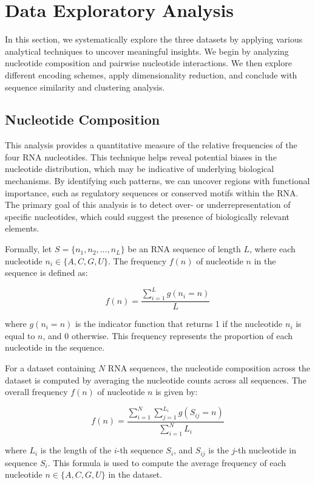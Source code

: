 \section{Data Exploratory Analysis}\label{sec:data-exploratroy-analysis}
  In this section, we systematically explore the three datasets by applying various analytical techniques to uncover meaningful insights.
  We begin by analyzing nucleotide composition and pairwise nucleotide interactions.
  We then explore different encoding schemes, apply dimensionality reduction, and conclude with sequence similarity and clustering analysis.

  \subsection{Nucleotide Composition}\label{subsec:nucleotide-composition}
    This analysis provides a quantitative measure of the relative frequencies of the four RNA nucleotides.
    This technique helps reveal potential biases in the nucleotide distribution, which may be indicative of underlying biological mechanisms.
    By identifying such patterns, we can uncover regions with functional importance, such as regulatory sequences or conserved motifs within the RNA. The primary goal of this analysis is to detect over- or underrepresentation of specific nucleotides, which could suggest the presence of biologically relevant elements.

    Formally, let \( S = \{n_1, n_2, \dots, n_L\} \) be an RNA sequence of length \( L \), where each nucleotide \( n_i \in \{A, C, G, U\} \).
    The frequency \( f(n) \) of nucleotide \( n \) in the sequence is defined as:

    \[
      f(n) = \frac{\sum_{i=1}^{L} g(n_i = n)}{L}
    \]

    where \( g(n_i = n) \) is the indicator function that returns 1 if the nucleotide \( n_i \) is equal to \( n \), and 0 otherwise.
    This frequency represents the proportion of each nucleotide in the sequence.

    For a dataset containing \( N \) RNA sequences, the nucleotide composition across the dataset is computed by averaging the nucleotide counts across all sequences.
    The overall frequency \( f(n) \) of nucleotide \( n \) is given by:

    \[
      f(n) = \frac{\sum_{i=1}^{N} \sum_{j=1}^{L_i} g(S_{ij} = n)}{\sum_{i=1}^{N} L_i}
    \]

    where \( L_i \) is the length of the \( i \)-th sequence \( S_i \), and \( S_{ij} \) is the \( j \)-th nucleotide in sequence \( S_i \).
    This formula is used to compute the average frequency of each nucleotide \( n \in \{A, C, G, U\} \) in the dataset.

